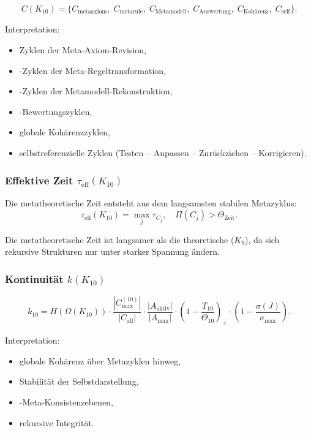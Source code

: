 \[
C(K_{10})=
\{
C_{\mathrm{metaaxiom}},\;
C_{\mathrm{metarule}},\;
C_{\mathrm{Metamodell}},\;
C_{\mathrm{Auswertung}},\;
C_{\mathrm{Kohärenz}},\;
C_{\mathrm{self}}
\}.
\]

Interpretation:
\begin{itemize}
    \item Zyklen der Meta-Axiom-Revision,
    \item-Zyklen der Meta-Regeltransformation,
    \item-Zyklen der Metamodell-Rekonstruktion,
    \item-Bewertungszyklen,
    \item globale Kohärenzzyklen,
    \item selbstreferenzielle Zyklen (Testen – Anpassen – Zurückziehen – Korrigieren).
\end{itemize}

\subsubsection{Effektive Zeit $\tau_{\mathrm{eff}}(K_{10})$}

Die metatheoretische Zeit entsteht aus dem langsamsten stabilen Metazyklus:
\[
\tau_{\mathrm{eff}}(K_{10}) = \max_j \tau_{C_j},
\quad
\Pi(C_j) > \Theta_{\mathrm{Zeit}}.
\]

Die metatheoretische Zeit ist langsamer als die theoretische ($K_9$), da sich rekursive Strukturen nur unter starker Spannung ändern.

\subsubsection{Kontinuität $k(K_{10})$}

\[
k_{10} =
H(\Omega(K_{10}))
\cdot
\frac{|C_{\max}^{(10)}|}{|C_{\mathrm{all}}|}
\cdot
\frac{|A_{\mathrm{aktiv}}|}{|A_{\max}|}
\cdot
\left(1-\frac{T_{10}}{\Theta_{10}}\right)_+
\cdot
\left(1-\frac{\sigma(J)}{\sigma_{\max}}\right).
\]

Interpretation:
\begin{itemize}
    \item globale Kohärenz über Metazyklen hinweg,
    \item Stabilität der Selbstdarstellung,
    \item-Meta-Konsistenzebenen,
    \item rekursive Integrität.
\end{itemize}

